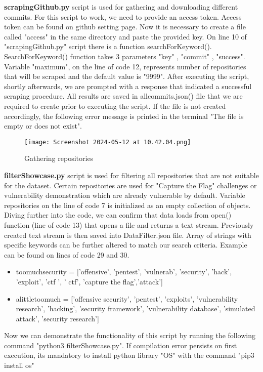     \textbf{scrapingGithub.py} script is used for gathering and downloading different commits. For this script to work, we need to provide an access token. Access token can be found on github setting page. Now
    it is necessary to create a file called "access" in the same directory and paste the provided key. On line 10 of "scrapingGithub.py" script
    there is a function searchForKeyword(). SearchForKeyword() function  
    takes 3 parameters "key" , "commit" , "success". Variable "maximum", on the line of code 12, represents number of repositories that will be scraped and the default value is "9999". After executing the script,
    shortly afterwards, we are prompted with a response that indicated a successful scraping procedure. All results are saved in allcommits.json() file that we are required to create prior to executing the script. If the file is not created accordingly, the following error message is printed in the terminal "The file is empty or does not exist".
    
     \begin{figure}
        \centering
        \texttt{[image: Screenshot 2024-05-12 at 10.42.04.png]}
        \caption{Gathering repositories}
        \label{fig:enter-label}
    \end{figure}
\newpage

    \textbf{filterShowcase.py} script is used for filtering all repositories that are not suitable for the dataset. Certain repositories are used for "Capture the Flag" challenges or vulnerability demonstration which are already vulnerable by default.
    Variable repositories on the line of code 7 is initialized as an empty collection of objects. Diving further into the code, we can confirm that data loads from open() function (line of code 13) that opens a file and returns a text stream. Previously created text stream is then saved into DataFilter.json file. Array of strings with specific keywords can be further altered to match our search criteria. Example can be found on lines of code 29 and 30.
     \begin{itemize}
     \item toomuchsecurity = ['offensive', 'pentest', 'vulnerab', 'security', 'hack', 'exploit', 'ctf ', ' ctf', 'capture the flag','attack'] 
     \item alittletoomuch = ['offensive security', 'pentest', 'exploits', 'vulnerability research', 'hacking', 'security framework', 'vulnerability database', 'simulated attack', 'security research'] 
     \end{itemize}
    Now we can demonstrate the functionality of this script by running the following command "python3 filterShowcase.py". If compilation error persists on first execution, its mandatory to install python library "OS" with the command "pip3 install os"
    
